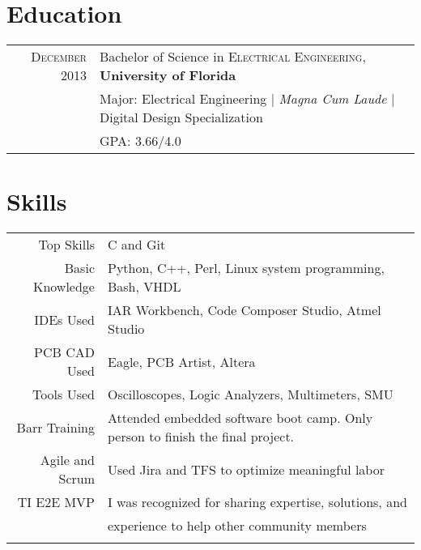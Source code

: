 \documentclass[a4paper,10pt]{article} %
\begin{document}

\section{Education}

\begin{tabular}{rl}
\textsc{December} 2013 & Bachelor of Science in \textsc{Electrical Engineering}, \textbf{University of Florida}\\
& \small{Major: Electrical Engineering  | \emph{Magna Cum Laude}  |  Digital Design Specialization}\\
&\normalsize \textsc{GPA}: 3.66/4.0\\


\end{tabular}


\section{Skills}

\begin{tabular}{rl}
Top Skills & C and Git\\
Basic Knowledge & Python, C++, Perl, Linux system programming, Bash, VHDL\\
IDEs Used & IAR Workbench, Code Composer Studio, Atmel Studio\\
PCB CAD Used & Eagle, PCB Artist, Altera\\
Tools Used &  Oscilloscopes, Logic Analyzers, Multimeters, SMU\\
Barr Training &  Attended embedded software boot camp. Only person to finish the final project.\\
Agile and Scrum & Used Jira and TFS to optimize meaningful labor\\
TI E2E MVP & I was recognized for sharing expertise, solutions, and \\ &  \hspace{5mm} experience to help other community members\\
\\
\end{tabular}
\end{document}
